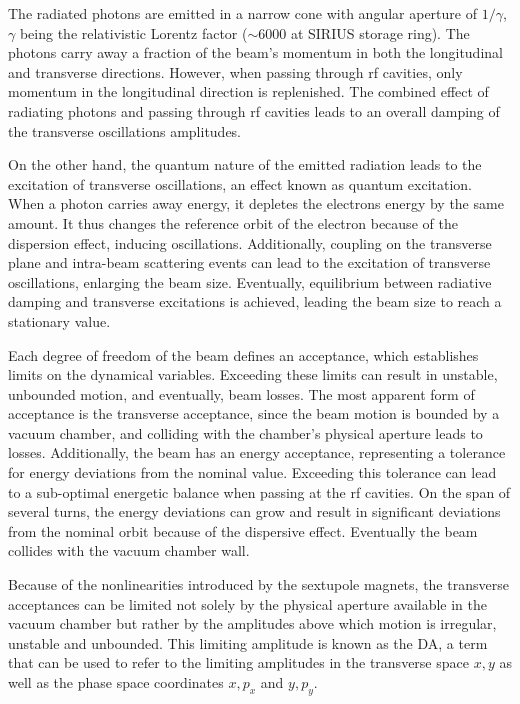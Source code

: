 The radiated photons are emitted in a narrow cone with angular aperture of $1/\gamma$, $\gamma$ being the relativistic Lorentz factor ($\sim 6000$ at SIRIUS storage ring). The photons carry away a fraction of the beam's momentum in both the longitudinal and transverse directions. However, when passing through \gls*{rf} cavities, only momentum in the longitudinal direction is replenished. The combined effect of radiating photons and passing through \gls*{rf} cavities leads to an overall damping of the transverse oscillations amplitudes.

On the other hand, the quantum nature of the emitted radiation leads to the excitation of transverse oscillations, an effect known as quantum excitation. When a photon carries away energy, it depletes the electrons energy by the same amount. It thus changes the reference orbit of the electron because of the dispersion effect, inducing oscillations. Additionally, coupling on the transverse plane and intra-beam scattering events can lead to the excitation of transverse oscillations, enlarging the beam size.
Eventually, equilibrium between radiative damping and transverse excitations is achieved, leading the beam size to reach a stationary value.

Each degree of freedom of the beam defines an acceptance, which establishes limits on the dynamical variables. Exceeding these limits can result in unstable, unbounded motion, and eventually, beam losses. The most apparent form of acceptance is the transverse acceptance, since the beam motion is bounded by a vacuum chamber, and colliding with the chamber's physical aperture leads to losses. Additionally, the beam has an energy acceptance, representing a tolerance for energy deviations from the nominal value. Exceeding this tolerance can lead to a sub-optimal energetic balance when passing at the \gls*{rf} cavities. On the span of several turns, the energy deviations can grow and result in significant deviations from the nominal orbit because of the dispersive effect. Eventually the beam collides with the vacuum chamber wall.

Because of the nonlinearities introduced by the sextupole magnets, the transverse acceptances can be limited not solely by the physical aperture available in the vacuum chamber but rather by the amplitudes above which motion is irregular, unstable and unbounded. This limiting amplitude is known as the \gls*{DA}, a term that can be used to refer to the limiting amplitudes in the transverse space $x,y$ as well as the phase space coordinates $x, p_x$ and $y, p_y$.

